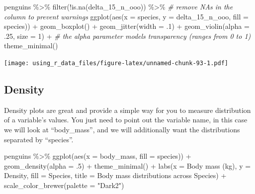 \documentclass[
]{book}
\newenvironment{Shaded}{\begin{snugshade}}{\end{snugshade}}
\newcommand{\AttributeTok}[1]{\textcolor[rgb]{0.77,0.63,0.00}{#1}}
\newcommand{\CommentTok}[1]{\textcolor[rgb]{0.56,0.35,0.01}{\textit{#1}}}
\newcommand{\DecValTok}[1]{\textcolor[rgb]{0.00,0.00,0.81}{#1}}
\newcommand{\FunctionTok}[1]{\textcolor[rgb]{0.00,0.00,0.00}{#1}}
\newcommand{\NormalTok}[1]{#1}
\newcommand{\SpecialCharTok}[1]{\textcolor[rgb]{0.00,0.00,0.00}{#1}}
\newcommand{\StringTok}[1]{\textcolor[rgb]{0.31,0.60,0.02}{#1}}
\begin{document}
\begin{Shaded}
\begin{Highlighting}[]
\NormalTok{penguins }\SpecialCharTok{\%\textgreater{}\%}
  \FunctionTok{filter}\NormalTok{(}\SpecialCharTok{!}\FunctionTok{is.na}\NormalTok{(delta\_15\_n\_ooo)) }\SpecialCharTok{\%\textgreater{}\%}  \CommentTok{\# remove NAs in the column to prevent warnings}
  \FunctionTok{ggplot}\NormalTok{(}\FunctionTok{aes}\NormalTok{(}\AttributeTok{x =}\NormalTok{ species, }\AttributeTok{y =}\NormalTok{ delta\_15\_n\_ooo, }\AttributeTok{fill =}\NormalTok{ species)) }\SpecialCharTok{+} 
  \FunctionTok{geom\_boxplot}\NormalTok{() }\SpecialCharTok{+}
  \FunctionTok{geom\_jitter}\NormalTok{(}\AttributeTok{width =}\NormalTok{ .}\DecValTok{1}\NormalTok{) }\SpecialCharTok{+}
  \FunctionTok{geom\_violin}\NormalTok{(}\AttributeTok{alpha =}\NormalTok{ .}\DecValTok{25}\NormalTok{, }\AttributeTok{size =} \DecValTok{1}\NormalTok{) }\SpecialCharTok{+}  \CommentTok{\# the alpha parameter models transparency (ranges from 0 to 1)}
  \FunctionTok{theme\_minimal}\NormalTok{()}
\end{Highlighting}
\end{Shaded}

\texttt{[image: using\_r\_data\_files/figure-latex/unnamed-chunk-93-1.pdf]}

\hypertarget{density}{%
\subsection{Density}\label{density}}

Density plots are great and provide a simple way for you to measure distribution of a variable's values.
You just need to point out the variable name, in this case we will look at ``body\_mass'', and we will additionally want the distributions separated by ``species''.

\begin{Shaded}
\begin{Highlighting}[]
\NormalTok{penguins }\SpecialCharTok{\%\textgreater{}\%} 
  \FunctionTok{ggplot}\NormalTok{(}\FunctionTok{aes}\NormalTok{(}\AttributeTok{x =}\NormalTok{ body\_mass, }\AttributeTok{fill =}\NormalTok{ species)) }\SpecialCharTok{+} 
  \FunctionTok{geom\_density}\NormalTok{(}\AttributeTok{alpha =}\NormalTok{ .}\DecValTok{5}\NormalTok{) }\SpecialCharTok{+}
  \FunctionTok{theme\_minimal}\NormalTok{() }\SpecialCharTok{+}
  \FunctionTok{labs}\NormalTok{(}\AttributeTok{x =} \StringTok{\textquotesingle{}Body mass (kg)\textquotesingle{}}\NormalTok{, }\AttributeTok{y =} \StringTok{\textquotesingle{}Density\textquotesingle{}}\NormalTok{,}
       \AttributeTok{fill =} \StringTok{\textquotesingle{}Species\textquotesingle{}}\NormalTok{, }
       \AttributeTok{title =} \StringTok{\textquotesingle{}Body mass distributions across Species\textquotesingle{}}\NormalTok{) }\SpecialCharTok{+}
  \FunctionTok{scale\_color\_brewer}\NormalTok{(}\AttributeTok{palette =} \StringTok{"Dark2"}\NormalTok{)}
\end{Highlighting}
\end{Shaded}
\end{document}
